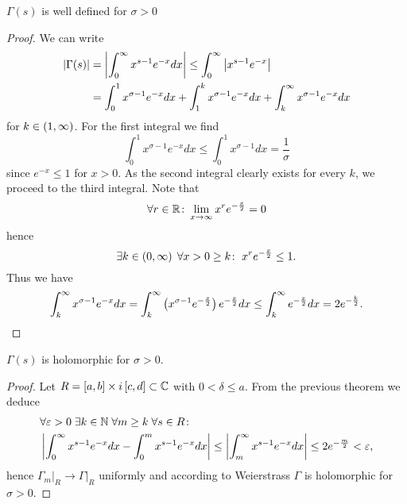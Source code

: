 \begin{theorem}
	$\Gamma(s)$ is well defined for $\sigma > 0$
\end{theorem}
\begin{proof}
	We can write
\begin{equation*}
\begin{aligned}
	\left|\Gamma(s)\right|
	&= \left|\int _0 ^\infty x^{s - 1} e^{-x} dx\right| \leq \int _0 ^\infty \left|x^{s - 1} e^{-x}\right| \\
	&= \int _0 ^1 x^{\sigma - 1} e^{-x} dx + \int _1 ^k x^{\sigma - 1} e^{-x} dx + \int _k ^\infty x^{\sigma - 1} e^{-x} dx
\end{aligned}
\end{equation*}
	for $k \in \left(1, \infty\right)$. For the first integral we find
\begin{equation*}
	\int _0 ^1 x^{\sigma - 1} e^{-x} dx \leq \int _0 ^1 x^{\sigma - 1} dx = \frac{1}{\sigma}
\end{equation*}
	since $e^{-x} \leq 1$ for $x > 0$. As the second integral clearly exists for every $k$, we proceed to the third integral. Note that
\begin{equation*}
	\forall r \in \mathbb{R} \colon \lim\limits_{x \to \infty} x^r e^{-\frac{x}{2}} = 0
\end{equation*}
 	hence
\begin{equation*}
	\exists k \in \left(0, \infty\right) \; \forall x > 0 \geq k \colon \; x^r e^{-\frac{x}{2}} \leq 1.
\end{equation*}
	Thus we have
\begin{equation*}
	\int _k ^\infty x^{\sigma - 1} e^{-x} dx = \int _k ^\infty \left(x^{\sigma - 1} e^{-\frac{x}{2}}\right) e^{-\frac{x}{2}} dx \leq \int _k ^\infty e^{-\frac{x}{2}} dx = 2 e^{-\frac{k}{2}}.
\end{equation*}
\end{proof}


\begin{theorem}
	$\Gamma(s)$ is holomorphic for $\sigma > 0$.
\end{theorem}
\begin{proof}
	Let $R = \left[a, b\right] \times i\left[c, d\right] \subset \mathbb{C}$ with $0 < \delta \leq a$. From the previous theorem we deduce
\begin{equation*}
\begin{aligned}
	&\forall \varepsilon > 0 \; \exists k \in \mathbb{N} \; \forall m \geq k \; \forall s \in R \colon \\
	&\left|\int _0 ^\infty x^{s - 1} e^{-x} dx - \int _0 ^m x^{s - 1} e^{-x} dx\right| \leq \left|\int _m ^\infty x^{s - 1} e^{-x} dx\right| \leq 2 e^{-\frac{m}{2}} < \varepsilon,
\end{aligned}
\end{equation*}
	hence $\Gamma_m \big\vert _R \to \Gamma \big\vert _R$ uniformly and according to Weierstrass $\Gamma$ is holomorphic for $\sigma > 0$.
\end{proof}


